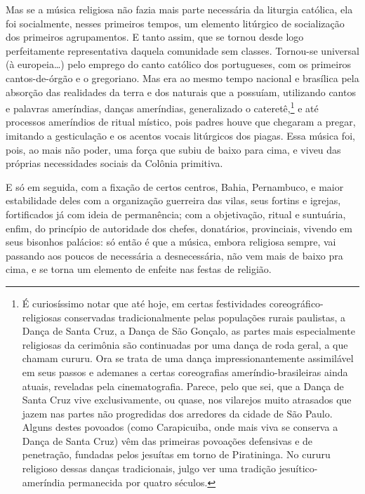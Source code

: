 Mas se a música religiosa não fazia mais parte necessária da liturgia
católica, ela foi socialmente, nesses primeiros tempos, um elemento
litúrgico de socialização dos primeiros agrupamentos. E tanto assim, que
se tornou desde logo perfeitamente representativa daquela comunidade sem
classes. Tornou-se universal (à europeia\ldots{}) pelo emprego do canto
católico dos portugueses, com os primeiros cantos-de-órgão e o
gregoriano. Mas era ao mesmo tempo nacional e brasílica pela absorção
das realidades da terra e dos naturais que a possuíam, utilizando cantos
e palavras ameríndias, danças ameríndias, generalizado o cateretê,\footnote{É curiosíssimo notar que até hoje, em certas festividades
  coreográfico-religiosas conservadas tradicionalmente pelas populações
  rurais paulistas, a Dança de Santa Cruz, a Dança de São Gonçalo, as
  partes mais especialmente religiosas da cerimônia são continuadas por
  uma dança de roda geral, a que chamam cururu. Ora se trata de uma
  dança impressionantemente assimilável em seus passos e ademanes a
  certas coreografias ameríndio-brasileiras ainda atuais, reveladas pela
  cinematografia. Parece, pelo que sei, que a Dança de Santa Cruz vive
  exclusivamente, ou quase, nos vilarejos muito atrasados que jazem nas
  partes não progredidas dos arredores da cidade de São Paulo. Alguns
  destes povoados (como Carapicuiba, onde mais viva se conserva a Dança
  de Santa Cruz) vêm das primeiras povoações defensivas e de penetração,
  fundadas pelos jesuítas em torno de Piratininga. No cururu religioso
  dessas danças tradicionais, julgo ver uma tradição jesuítico-ameríndia
  permanecida por quatro séculos.} e
até processos ameríndios de ritual místico, pois padres houve que
chegaram a pregar, imitando a gesticulação e os acentos vocais
litúrgicos dos piagas. Essa música foi, pois, ao mais não poder, uma
força que subiu de baixo para cima, e viveu das próprias necessidades
sociais da Colônia primitiva.

E só em seguida, com a fixação de certos centros, Bahia, Pernambuco, e
maior estabilidade deles com a organização guerreira das vilas, seus
fortins e igrejas, fortificados já com ideia de permanência; com a
objetivação, ritual e suntuária, enfim, do princípio de autoridade dos
chefes, donatários, provinciais, vivendo em seus bisonhos palácios: só
então é que a música, embora religiosa sempre, vai passando aos poucos
de necessária a desnecessária, não vem mais de baixo pra cima, e se
torna um elemento de enfeite nas festas de religião.

